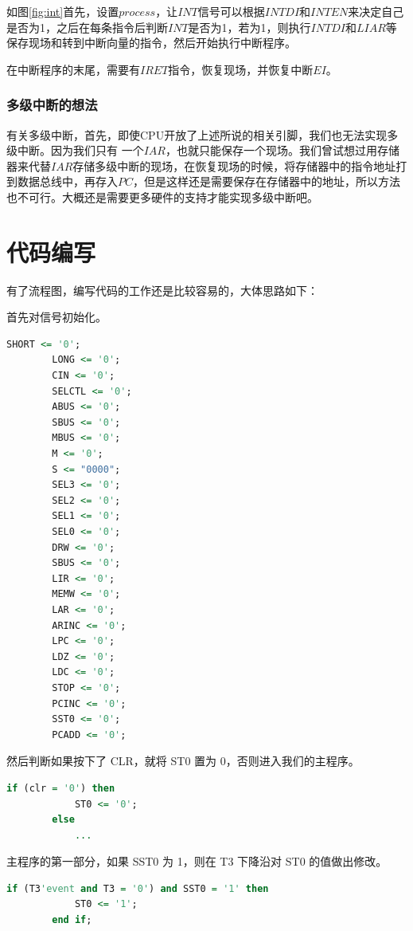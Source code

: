 \documentclass[12pt]{article}
\begin{document}
{        如图\ref{fig:int}首先，设置$process$，让$INT$信号可以根据$INTDI$和$INTEN$来决定自己是否为1，之后在每条指令后判断$INT$是否为1，若为1，则执行$INTDI$和$LIAR$等保存现场和转到中断向量的指令，然后开始执行中断程序。
        
        在中断程序的末尾，需要有$IRET$指令，恢复现场，并恢复中断$EI$。
        
        \subsubsection{多级中断的想法}
        有关多级中断，首先，即使CPU开放了上述所说的相关引脚，我们也无法实现多级中断。因为我们只有
        一个$IAR$，也就只能保存一个现场。我们曾试想过用存储器来代替$IAR$存储多级中断的现场，在恢复现场的时候，将存储器中的指令地址打到数据总线中，再存入$PC$，但是这样还是需要保存在存储器中的地址，所以方法也不可行。大概还是需要更多硬件的支持才能实现多级中断吧。
        
\section{代码编写}
    有了流程图，编写代码的工作还是比较容易的，大体思路如下：
    
    首先对信号初始化。
    
    \begin{lstlisting}[language=vhdl]
        SHORT <= '0';
        LONG <= '0';
        CIN <= '0';
        SELCTL <= '0';
        ABUS <= '0';
        SBUS <= '0';
        MBUS <= '0';
        M <= '0';
        S <= "0000";
        SEL3 <= '0';
        SEL2 <= '0';
        SEL1 <= '0';
        SEL0 <= '0';
        DRW <= '0';
        SBUS <= '0';
        LIR <= '0';
        MEMW <= '0';
        LAR <= '0';
        ARINC <= '0';
        LPC <= '0';
        LDZ <= '0';
        LDC <= '0';
        STOP <= '0';
        PCINC <= '0';
        SST0 <= '0';
        PCADD <= '0';
    \end{lstlisting}
    
    然后判断如果按下了 CLR，就将 ST0 置为 0，否则进入我们的主程序。
    
    \begin{lstlisting}[language=vhdl]
        if (clr = '0') then
            ST0 <= '0';
        else
            ...
    \end{lstlisting}
    
    主程序的第一部分，如果 SST0 为 1，则在 T3 下降沿对 ST0 的值做出修改。
    
    \begin{lstlisting}[language=vhdl]
        if (T3'event and T3 = '0') and SST0 = '1' then
            ST0 <= '1';
        end if;
    \end{lstlisting}
    
}
\end{document}
